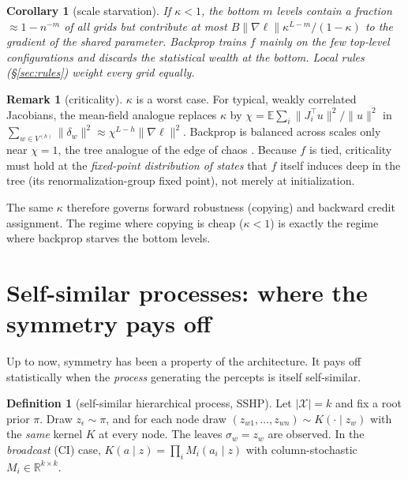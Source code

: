 \documentclass[11pt]{article}
\newtheorem{corollary}[theorem]{Corollary}
\theoremstyle{definition}
\newtheorem{definition}[theorem]{Definition}
\newtheorem{remark}[theorem]{Remark}
\newcommand{\R}{\mathbb{R}}
\newcommand{\E}{\mathbb{E}}
\newcommand{\cX}{\mathcal{X}}
\newcommand{\norm}[1]{\lVert #1\rVert}
\begin{document}
\begin{corollary}[scale starvation]\label{cor:starve}
If $\kappa<1$, the bottom $m$ levels contain a fraction $\approx1-n^{-m}$ of all grids but contribute at
most $B\norm{\nabla\ell}\kappa^{L-m}/(1-\kappa)$ to the gradient of the shared parameter.
Backprop trains $f$ mainly on the few top-level configurations and discards the statistical
wealth at the bottom. Local rules (\S\ref{sec:rules}) weight every grid equally.
\end{corollary}
\begin{remark}[criticality]
$\kappa$ is a worst case. For typical, weakly correlated Jacobians, the mean-field analogue
replaces $\kappa$ by $\chi=\E\sum_i\norm{J_i^\top u}^2/\norm u^2$ in
$\sum_{w\in V^{(h)}}\norm{\delta_w}^2\approx\chi^{L-h}\norm{\nabla\ell}^2$. Backprop is balanced
across scales only near $\chi=1$, the tree analogue of the edge of chaos \cite{schoenholz2017}.
Because $f$ is tied, criticality must hold at the \emph{fixed-point distribution of states} that
$f$ itself induces deep in the tree (its renormalization-group fixed point), not merely at
initialization.
\end{remark}
\noindent The same $\kappa$ therefore governs forward robustness (copying) and backward credit
assignment. The regime where copying is cheap ($\kappa<1$) is exactly the regime where
backprop starves the bottom levels.

\section{Self-similar processes: where the symmetry pays off}\label{sec:sshp}
Up to now, symmetry has been a property of the architecture. It pays off statistically when the
\emph{process} generating the percepts is itself self-similar.

\begin{definition}[self-similar hierarchical process, SSHP]
Let $|\cX|=k$ and fix a root prior $\pi$. Draw $z_\epsilon\sim\pi$, and for each node draw
$(z_{w1},\dots,z_{wn})\sim K(\cdot\mid z_w)$ with the \emph{same} kernel $K$ at every node. The
leaves $\sigma_w=z_w$ are observed. In the \emph{broadcast} (CI) case,
$K(a\mid z)=\prod_iM_i(a_i\mid z)$ with column-stochastic $M_i\in\R^{k\times k}$.
\end{definition}
\end{document}
